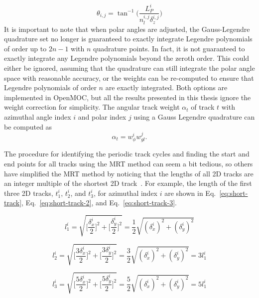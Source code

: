 \begin{equation}
\theta_{i,j} = \tan^{-1} \bigg( \frac{L_P^i}{n_l^{i,j} \delta_z^{i,j}}\bigg)
\label{eq:MRT-theta-correct}
\end{equation}
It is important to note that when polar angles are adjusted, the Gauss-Legendre quadrature set no longer is guaranteed to exactly integrate Legendre polynomials of order up to $2n-1$ with $n$ quadrature points. In fact, it is not guaranteed to exactly integrate any Legendre polynomials beyond the zeroth order. This could either be ignored, assuming that the quadrature can still integrate the polar angle space with reasonable accuracy, or the weights can be re-computed to ensure that Legendre polynomials of order $n$ are exactly integrated. Both options are implemented in OpenMOC, but all the results presented in this thesis ignore the weight correction for simplicity. The angular track weight $\alpha_t$ of track $t$ with azimuthal angle index $i$ and polar index $j$ using a Gauss Legendre quadrature can be computed as
\begin{equation}
\alpha_t = w_{\phi}^i w_{\textit{gl}}^j .
\end{equation}

The procedure for identifying the periodic track cycles and finding the start and end points for all tracks using the \ac{MRT} method can seem a bit tedious, so others have simplified the \ac{MRT} method by noticing that the lengths of all 2D tracks are an integer multiple of the shortest 2D track~\cite{kochunas}. For example, the length of the first three 2D tracks, $t_1^i$, $t_2^i$, and $t_3^i$, for azimuthal index $i$ are shown in Eq.~\ref{eq:short-track}, Eq.~\ref{eq:short-track-2}, and Eq.~\ref{eq:short-track-3}.

\begin{equation}
l_1^i = \sqrt{\bigg[\frac{\delta_x^i}{2}\bigg]^2 + \bigg[\frac{\delta_y^i}{2}\bigg]^2} = \frac{1}{2} \sqrt{(\delta_x^i)^2 + (\delta_y^i)^2}
\label{eq:short-track}
\end{equation}

\begin{equation}
l_2^i = \sqrt{\bigg[\frac{3 \delta_x^i}{2}\bigg]^2 + \bigg[\frac{3 \delta_y^i}{2}\bigg]^2} = \frac{3}{2} \sqrt{(\delta_x^i)^2 + (\delta_y^i)^2} = 3 l_1^i
\label{eq:short-track-2}
\end{equation}

\begin{equation}
l_3^i = \sqrt{\bigg[\frac{5 \delta_x^i}{2}\bigg]^2 + \bigg[\frac{5 \delta_y^i}{2}\bigg]^2} = \frac{5}{2} \sqrt{(\delta_x^i)^2 + (\delta_y^i)^2} = 5 l_1^i
\label{eq:short-track-3}
\end{equation}

